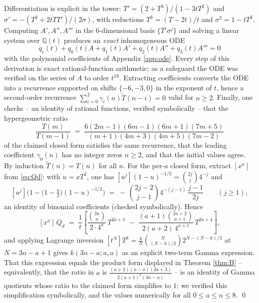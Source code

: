 \documentclass[11pt]{article}
\begin{document}
Differentiation is explicit in the tower: $T' = (2+T^3)/(1-3tT^2)$ and $\sigma' = -(T^2+2tTT')/(2\sigma)$, with reductions $T^3=(T-2t)/t$ and $\sigma^2 = 1-tT^2$. Computing $A',A'',A'''$ in the $6$-dimensional basis $\{T^i\sigma^j\}$ and solving a linear system over $\mathbb{Q}(t)$ produces an \emph{exact} inhomogeneous ODE
\[ q_c(t) + q_0(t)A + q_1(t)A' + q_2(t)A'' + q_3(t)A''' = 0 \]
with the polynomial coefficients of Appendix \ref{app:ode}. Every step of this derivation is exact rational-function arithmetic; as a safeguard the ODE was verified on the series of $A$ to order $t^{19}$. Extracting coefficients converts the ODE into a recurrence supported on shifts $\{-6,-3,0\}$ in the exponent of $t$, hence a second-order recurrence $\sum_{i=0}^{2}\gamma_i(n)\widetilde T(n-i) = 0$ valid for $n \ge 2$. Finally, one checks -- an identity of rational functions, verified symbolically -- that the hypergeometric ratio
\[ \frac{T(m)}{T(m-1)} \;=\; \frac{6(2m-1)(6m-1)(6m+1)(7m+5)}{(m+1)(4m+3)(4m+5)(7m-2)} \]
of the claimed closed form satisfies the same recurrence, that the leading coefficient $\gamma_0(n)$ has no integer zeros $n\ge2$, and that the initial values agree. By induction $\widetilde T(n) = T(n)$ for all $n$. For the per-$a$ closed form, extract $[x^a]$ from \eqref{eq:Qd}: with $u=xT^2$, one has $[u^j](1-u)^{-1/2} = \binom{2j}{j}4^{-j}$ and
\[ [u^j]\Big(1 - \big(1-\tfrac u2\big)(1-u)^{-1/2}\Big) \;=\; -\,\binom{2j-2}{j-1}4^{-(j-1)}\,\frac{j-1}{2j}\qquad(j\ge1), \]
an identity of binomial coefficients (checked symbolically). Hence
\[ [x^a]\,Q_d \;=\; \frac1t\left[\frac{\binom{2a}{a}}{2\cdot4^{a}}\,T^{2a+1} \;-\; \frac{(a+1)\binom{2a+2}{a+1}}{2(a+2)\,4^{a+1}}\,T^{2a+4}\right], \]
and applying Lagrange inversion $[t^N]T^k = \frac kN\binom{N}{(N-k)/3}2^{N-(N-k)/3}$ at $N = 3n-a+1$ gives $k(3n-a;a,a)$ as an explicit two-term Gamma expression. That this expression equals the product form displayed in Theorem \ref{thm:B} -- equivalently, that the ratio in $a$ is $\frac{(a+2)(n-a)(2a+3)}{2(a+1)^2(3n-a)}$ -- is an identity of Gamma quotients whose ratio to the claimed form simplifies to $1$; we verified this simplification symbolically, and the values numerically for all $0\le a\le n\le 8$. \qed
\end{document}
